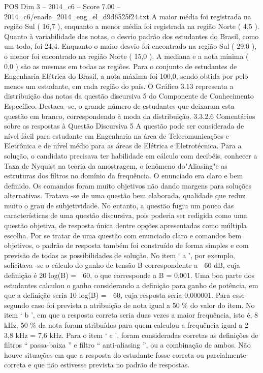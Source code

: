 \begin{textsample}{POS Dim 3 – 2014\_c6 – Score 7.00 – 2014\_c6/enade\_2014\_eng\_el\_d9d6525f24.txt}
A maior média foi registrada na região Sul ( 16,7 ), enquanto a menor média foi registrada na região Norte ( 4,5 ).
Quanto à variabilidade das notas, o desvio padrão dos estudantes do Brasil, como um todo, foi 24,4.
Enquanto o maior desvio foi encontrado na região Sul ( 29,0 ), o menor foi encontrado na região Norte ( 15,0 ).
A mediana e a nota mínima ( 0,0 ) são as mesmas em todas as regiões.
Para o conjunto de estudantes de Engenharia Elétrica do Brasil, a nota máxima foi 100,0, sendo obtida por pelo menos um estudante, em cada região do país.
O Gráfico 3.13 representa a distribuição das notas da questão discursiva 5 do Componente de Conhecimento Específico.
Destaca -se, o grande número de estudantes que deixaram esta questão em branco, correspondendo à moda da distribuição. 3.3.2.6 Comentários sobre as respostas à Questão Discursiva 5 A questão pode ser considerada de nível fácil para estudante em Engenharia na área de Telecomunicações e Eletrônica e de nível médio para as áreas de Elétrica e Eletrotécnica.
Para a solução, o candidato precisava ter habilidade em cálculo com decibéis, conhecer a Taxa de Nyquist na teoria da amostragem, o fenômeno do"Aliasing"e as estruturas dos filtros no domínio da frequência.
O enunciado era claro e bem definido.
Os comandos foram muito objetivos não dando margens para soluções alternativas.
Tratava -se de uma questão bem elaborada, qualidade que reduz muito o grau de subjetividade.
No entanto, a questão fugiu um pouco das características de uma questão discursiva, pois poderia ser redigida como uma questão objetiva, de resposta única dentre opções apresentadas como múltipla escolha.
Por se tratar de uma questão com enunciado claro e comandos bem objetivos, o padrão de resposta também foi construído de forma simples e com previsão de todas as possibilidades de solução.
No item ‘ a ’, por exemplo, solicitava -se o cálculo do ganho de tensão B correspondente a  60 dB, cuja definição é 20 log(B) =  60, o que corresponde a B = 0,001.
Uma boa parte dos estudantes calculou o ganho considerando a definição para ganho de potência, em que a definição seria 10 log(B) =  60, cuja resposta seria 0,000001.
Para esse segundo caso foi prevista a atribuição de nota igual a 50 \% do valor do item.
No item ‘ b ’, em que a resposta correta seria duas vezes a maior frequência, isto é, 8 kHz, 50 \% da nota foram atribuídos para quem calculou a frequência igual a 2  3,8 kHz = 7,6 kHz.
Para o item ‘ c ’, foram consideradas corretas as definições de filtros “ passa-baixa ” e filtro “ anti-aliasing ”, ou a combinação de ambos.
Não houve situações em que a resposta do estudante fosse correta ou parcialmente correta e que não estivesse prevista no padrão de respostas.

\end{textsample}
